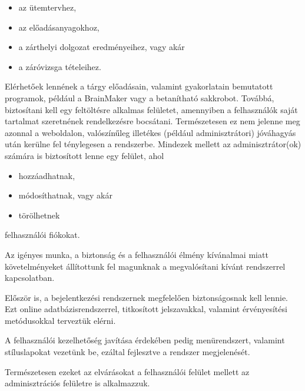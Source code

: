 \begin{itemize}
\item az ütemtervhez,
\item az előadásanyagokhoz,
\item a zárthelyi dolgozat eredményeihez, vagy akár
\item a záróvizsga tételeihez.
\end{itemize}

Elérhetőek lennének a tárgy előadásain, valamint gyakorlatain bemutatott programok, például a BrainMaker vagy a betanítható sakkrobot. Továbbá, biztosítani kell egy feltöltésre alkalmas felületet, amennyiben a felhasználók saját tartalmat szeretnének rendelkezésre bocsátani. Természetesen ez nem jelenne meg azonnal a weboldalon, valószínűleg illetékes (például adminisztrátori) jóváhagyás után kerülne fel ténylegesen a rendszerbe. Mindezek mellett az adminisztrátor(ok) számára is biztosított lenne egy felület, ahol
\begin{itemize}
\item hozzáadhatnak,
\item módosíthatnak, vagy akár
\item törölhetnek
\end{itemize}felhasználói fiókokat.


Az igényes munka, a biztonság és a felhasználói élmény kívánalmai miatt követelményeket állítottunk fel magunknak a megvalósítani kívánt rendszerrel kapcsolatban.

Először is, a bejelentkezési rendszernek megfelelően biztonságosnak kell lennie. Ezt online adatbázisrendszerrel, titkosított jelszavakkal, valamint érvényesítési metódusokkal terveztük elérni.

A felhasználói kezelhetőség javítása érdekében pedig menürendszert, valamint stíluslapokat vezetünk be, ezáltal fejlesztve a rendszer megjelenését.

Természetesen ezeket az elvárásokat a felhasználói felület mellett az adminisztrációs felületre is alkalmazzuk.